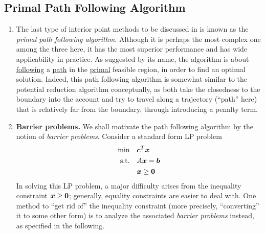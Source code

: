 \subsection{Primal Path Following Algorithm}
\begin{enumerate}
\item The last type of interior point methods to be discussed in
 is known as the \emph{primal path following
algorithm}. Although it is perhaps the most complex one among the three here,
it has the most superior performance and has wide applicability in practice.
As suggested by its name, the algorithm is about \underline{following} a
\underline{path} in the \underline{primal} feasible region, in order to find an
optimal solution. Indeed, this path following algorithm is somewhat similar to
the potential reduction algorithm conceptually, as both take the closedness to
the boundary into the account and try to travel along a trajectory
(``path'' here) that is relatively far from the boundary, through introducing
a penalty term.
\item \textbf{Barrier problems.} We shall motivate the path following algorithm
by the notion of \emph{barrier problems}. Consider a standard form LP problem
\begin{align*}
\text{min}\quad&\bm{c}^{T}\bm{x} \\
\text{s.t.}\quad&A\bm{x}=\bm{b} \\
&\bm{x}\ge \bm{0}
\end{align*}
In solving this LP problem, a major difficulty arises from the inequality
constraint \(\bm{x}\ge\bm{0}\); generally, equality constraints are easier
to deal with. One method to ``get rid of'' the inequality constraint (more
precisely, ``converting'' it to some other form) is to analyze the
associated \emph{barrier problems} instead, as specified in the following.


\end{enumerate}
